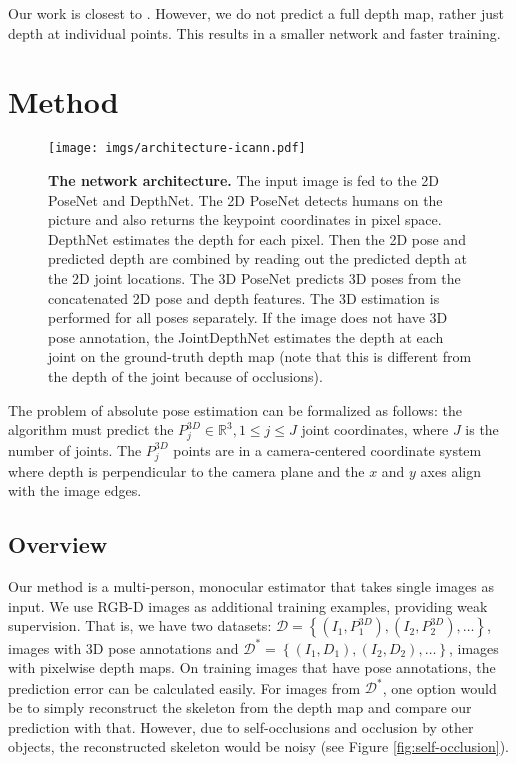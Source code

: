 \documentclass[runningheads]{llncs}
\begin{document}
Our work is closest to \cite{cai2018weakhand}. However, we do not predict a full depth map, rather just depth at individual points. This results in a smaller network and faster training.

\section{Method}

\begin{figure*}[t]
\begin{center}
\texttt{[image: imgs/architecture-icann.pdf]}
\end{center}
\caption{\textbf{The network architecture.} The input image is fed to the 2D PoseNet and DepthNet. The 2D PoseNet detects humans on the picture and also returns the keypoint coordinates in pixel space. DepthNet estimates the depth for each pixel. Then the 2D pose and predicted depth are combined by reading out the predicted depth at the 2D joint locations. The 3D PoseNet predicts 3D poses from the concatenated 2D pose and depth features. The 3D estimation is performed for all poses separately. If the image does not have 3D pose annotation, the JointDepthNet estimates the depth at each joint on the ground-truth depth map (note that this is different from the depth of the joint because of occlusions).}
\label{fig:architecture}
\end{figure*}

The problem of absolute pose estimation can be formalized as follows: the algorithm must predict the $P^{3D}_j\in \mathbb{R}^3,1\le j\le J$ joint coordinates, where $J$ is the number of joints. The $P^{3D}_j$ points are in a camera-centered coordinate system where depth is perpendicular to the camera plane and the $x$ and $y$ axes align with the image edges.

\subsection{Overview} \label{sec:overview}
Our method is a multi-person, monocular estimator that takes single images as input. We use RGB\nobreakdash-D images as additional training examples, providing weak supervision. That is, we have two datasets: $\mathcal{D}=\left\{(I_1,P_1^{3D}), (I_2,P_2^{3D}),\ldots\right\}$, images with 3D pose annotations and $\mathcal{D}^*=\left\{(I_1,D_1), (I_2,D_2),\ldots\right\}$, images with pixelwise depth maps. On training images that have pose annotations, the prediction error can be calculated easily. For images from $\mathcal{D}^*$, one option would be to simply reconstruct the skeleton from the depth map and compare our prediction with that. However, due to self-occlusions and occlusion by other objects, the reconstructed skeleton would be noisy (see Figure \ref{fig:self-occlusion}). 
\end{document}
